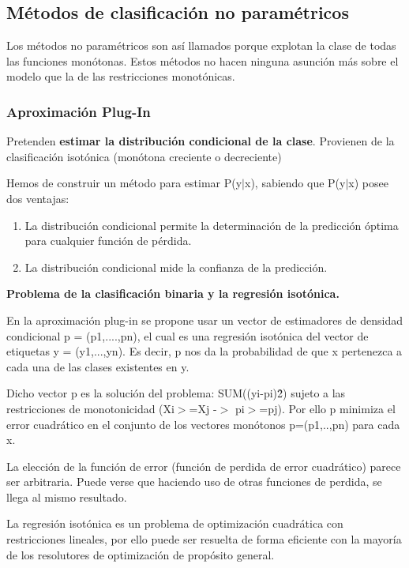 \subsection{Métodos de clasificación no paramétricos}

Los métodos no paramétricos son así llamados porque explotan la clase de todas las
funciones monótonas. Estos métodos no hacen ninguna asunción más sobre el modelo que la de 
las restricciones monotónicas.

\subsubsection{Aproximación Plug-In}

Pretenden \textbf{estimar la distribución condicional de la clase}. Provienen de la
clasificación isotónica (monótona creciente o decreciente)

Hemos de construir un método para estimar P(y$|$x), sabiendo que P(y$|$x) posee
dos ventajas:
\begin{enumerate}
	\item La distribución condicional permite la determinación de la predicción 
	óptima para cualquier función de pérdida.
	\item La distribución condicional mide la confianza de la predicción.
\end{enumerate}


\textbf{Problema de la clasificación binaria y la regresión isotónica.}

En la aproximación plug-in se propone usar un vector de estimadores de densidad
condicional p = (p1,....,pn), el cual es una regresión isotónica del vector de
etiquetas y = (y1,...,yn). Es decir, p nos da la probabilidad de que x 
pertenezca a cada una de las clases existentes en y.

Dicho vector p es la solución del problema: SUM((yi-pi)\^2) sujeto a las restricciones de
monotonicidad (Xi$>$=Xj -$>$ pi$>$=pj). Por ello p minimiza el error cuadrático en 
el conjunto de los vectores monótonos p=(p1,..,pn) para cada x.

La elección de la función de error (función de perdida de error cuadrático)
parece ser arbitraria. Puede verse que haciendo uso de otras funciones
de perdida, se llega al mismo resultado.

La regresión isotónica es un problema de optimización cuadrática con 
restricciones lineales, por ello puede ser resuelta de forma eficiente con
la mayoría de los resolutores de optimización de propósito general.

